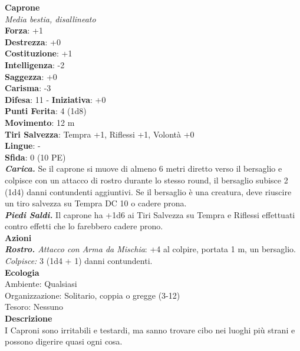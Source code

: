 \begin{multicols}{2}
\medskip\textbf{Caprone}\\
\emph{Media bestia, disallineato}\\
\textbf{Forza}: +1\\
\textbf{Destrezza}: +0\\
\textbf{Costituzione}: +1\\
\textbf{Intelligenza}: -2\\
\textbf{Saggezza}: +0\\
\textbf{Carisma}: -3\\
\textbf{Difesa}: 11 - \textbf{Iniziativa}: +0\\
\textbf{Punti Ferita}: 4 (1d8)\\
\textbf{Movimento}: 12 m\\
\textbf{Tiri Salvezza}: Tempra +1, Riflessi +1, Volontà +0 \\
\textbf{Lingue}: -\\
\textbf{Sfida}: 0 (10 PE)\smallskip\\
\emph{\textbf{Carica.}} Se il caprone si muove di almeno 6 metri diretto verso il bersaglio e colpisce con un attacco di rostro durante lo stesso round, il bersaglio subisce 2 (1d4) danni contundenti aggiuntivi. Se il bersaglio è una creatura, deve riuscire un tiro salvezza su Tempra DC 10 o cadere prona.\\
\emph{\textbf{Piedi Saldi.}} Il caprone ha +1d6 ai Tiri Salvezza su Tempra e Riflessi effettuati contro effetti che lo farebbero cadere prono.  \\
\smallskip\textbf{Azioni}\\
\emph{\textbf{Rostro.} Attacco con Arma da Mischia}: +4 al colpire, portata 1 m, un bersaglio.\\
\emph{Colpisce:} 3 (1d4 + 1) danni contundenti.\\
\textbf{Ecologia}\\
Ambiente: Qualsiasi\\
Organizzazione: Solitario, coppia o gregge (3-12)\\
Tesoro: Nessuno\\
\textbf{Descrizione}\\
I Caproni sono irritabili e testardi, ma sanno trovare cibo nei luoghi più strani e possono digerire quasi ogni cosa. \\


\end{multicols}
